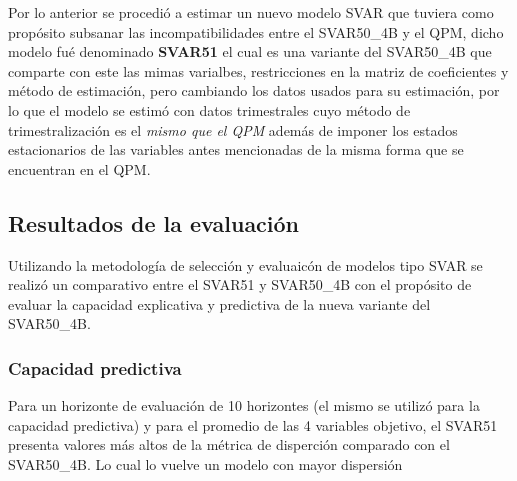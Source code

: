 \documentclass[
  letterpaper,
  DIV=11,
  numbers=noendperiod]{scrartcl}
\begin{document}
Por lo anterior se procedió a estimar un nuevo modelo SVAR que tuviera
como propósito subsanar las incompatibilidades entre el SVAR50\_4B y el
QPM, dicho modelo fué denominado \textbf{SVAR51} el cual es una variante
del SVAR50\_4B que comparte con este las mimas varialbes, restricciones
en la matriz de coeficientes y método de estimación, pero cambiando los
datos usados para su estimación, por lo que el modelo se estimó con
datos trimestrales cuyo método de trimestralización es el \emph{mismo
que el QPM} además de imponer los estados estacionarios de las variables
antes mencionadas de la misma forma que se encuentran en el QPM.

\subsection{Resultados de la
evaluación}\label{resultados-de-la-evaluaciuxf3n}

Utilizando la metodología de selección y evaluaicón de modelos tipo SVAR
se realizó un comparativo entre el SVAR51 y SVAR50\_4B con el propósito
de evaluar la capacidad explicativa y predictiva de la nueva variante
del SVAR50\_4B.

\subsubsection{Capacidad predictiva}\label{capacidad-predictiva}

Para un horizonte de evaluación de 10 horizontes (el mismo se utilizó
para la capacidad predictiva) y para el promedio de las 4 variables
objetivo, el SVAR51 presenta valores más altos de la métrica de
disperción comparado con el SVAR50\_4B. Lo cual lo vuelve un modelo con
mayor dispersión
\end{document}
